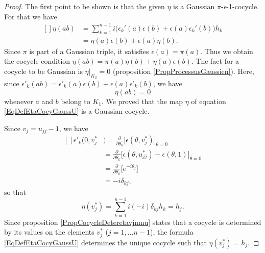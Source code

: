 \begin{proof}

    The first point to be shown is that the given $\eta$ is a Gaussian $\pi$-$\epsilon$-1-cocycle. For that we have
    \begin{equation}
        \begin{aligned}[]
            \eta(ab)&=\sum_{k=1}^{n-1}i\Big( \epsilon_k'(a)\epsilon(b)+\epsilon(a)\epsilon_k'(b) \Big)h_k\\
            &=\eta(a)\epsilon(b)+\epsilon(a)\eta(b).
        \end{aligned}
    \end{equation}
    Since $\pi$ is part of a Gaussian triple, it satisfies $\epsilon(a)=\pi(a)$. Thus we obtain the cocycle condition $\eta(ab)=\pi(a)\eta(b)+\eta(a)\epsilon(b)$. The fact for a cocycle to be Gaussian is $\eta|_{K_2}=0$ (proposition \ref{PropProcessusGaussien}). Here, since $\epsilon'_k(ab)=\epsilon'_k(a)\epsilon(b)+\epsilon(a)\epsilon'_k(b)$, we have
    \begin{equation}
        \eta(ab)=0
    \end{equation}
    whenever $a$ and $b$ belong to $K_1$. We proved that the map $\eta$ of equation \eqref{EqDefEtaCocyGaussU} is a Gaussian cocycle.

    Since $v_j=u_{jj}-1$, we have
    \begin{equation}
        \begin{aligned}[]
            \epsilon'_k(0,v_j^*&)=\frac{ \partial  }{ \partial \theta_k }\big[ \epsilon(\theta,v_j^*) \big]_{\theta=0}\\
            &=\frac{ \partial  }{ \partial \theta_k }\big[ \epsilon(\theta,u_{jj}^*)-\epsilon(\theta,1) \big]_{\theta=0}\\
            &=\frac{ \partial  }{ \partial \theta_k }\big[  e^{-i\theta_j} \big]\\
            &=-i\delta_{kj},
        \end{aligned}
    \end{equation}
    so that
    \begin{equation}
        \eta(v_j^*)=\sum_{k=1}^{n-1}i(-i)\delta_{kj}h_k=h_j.
    \end{equation}
    Since proposition \ref{PropCocycleDeteretavjnmu} states that a cocycle is determined by its values on the elements $v_j^*$ ($j=1,\ldots n-1$), the formula \eqref{EqDefEtaCocyGaussU} determines the unique cocycle such that $\eta(v_j^*)=h_j$.
\end{proof}


